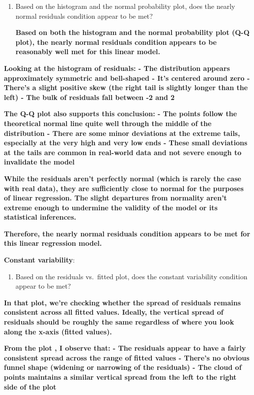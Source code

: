 \documentclass[
]{article}
\providecommand{\tightlist}{%
  \setlength{\itemsep}{0pt}\setlength{\parskip}{0pt}}
\begin{document}
\begin{enumerate}
\def\labelenumi{\arabic{enumi}.}
\setcounter{enumi}{7}
\item
  Based on the histogram and the normal probability plot, does the
  nearly normal residuals condition appear to be met?

  \textbf{Based on both the histogram and the normal probability plot
  (Q-Q plot), the nearly normal residuals condition appears to be
  reasonably well met for this linear model.}
\end{enumerate}

\textbf{Looking at the histogram of residuals: - The distribution
appears approximately symmetric and bell-shaped - It's centered around
zero - There's a slight positive skew (the right tail is slightly longer
than the left) - The bulk of residuals fall between -2 and 2}

\textbf{The Q-Q plot also supports this conclusion: - The points follow
the theoretical normal line quite well through the middle of the
distribution - There are some minor deviations at the extreme tails,
especially at the very high and very low ends - These small deviations
at the tails are common in real-world data and not severe enough to
invalidate the model}

\textbf{While the residuals aren't perfectly normal (which is rarely the
case with real data), they are sufficiently close to normal for the
purposes of linear regression. The slight departures from normality
aren't extreme enough to undermine the validity of the model or its
statistical inferences.}

\textbf{Therefore, the nearly normal residuals condition appears to be
met for this linear regression model.}

\textbf{Constant variability}:

\begin{enumerate}
\def\labelenumi{\arabic{enumi}.}
\setcounter{enumi}{8}
\tightlist
\item
  Based on the residuals vs.~fitted plot, does the constant variability
  condition appear to be met?
\end{enumerate}

\textbf{In that plot, we're checking whether the spread of residuals
remains consistent across all fitted values. Ideally, the vertical
spread of residuals should be roughly the same regardless of where you
look along the x-axis (fitted values).}

\textbf{From the plot , I observe that: - The residuals appear to have a
fairly consistent spread across the range of fitted values - There's no
obvious funnel shape (widening or narrowing of the residuals) - The
cloud of points maintains a similar vertical spread from the left to the
right side of the plot}
\end{document}
